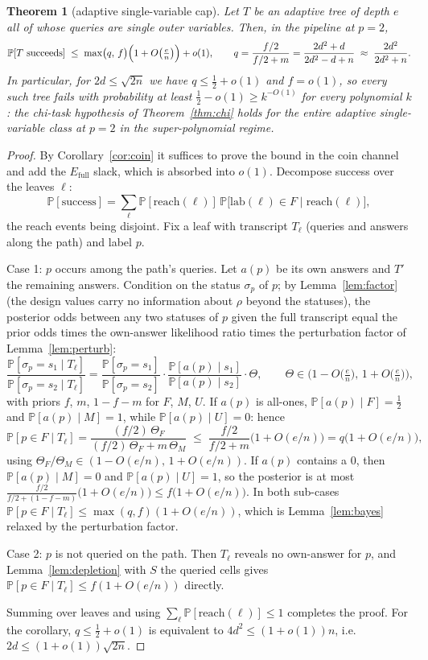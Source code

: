 \documentclass[11pt]{article}
\newtheorem{theorem}{Theorem}[section]
\theoremstyle{definition}
\theoremstyle{remark}
\newcommand{\Prob}{\mathbb{P}}
\newcommand{\lab}{\mathrm{lab}}
\begin{document}
\begin{theorem}[adaptive single-variable cap]\label{thm:B}
Let $T$ be an adaptive tree of depth $e$ all of whose queries are single
outer variables.  Then, in the pipeline at $p=2$,
\[
\Prob[T\text{ succeeds}]
\;\le\;\max\bigl(q,\,f\bigr)
\Bigl(1+O\bigl(\tfrac{e}{n}\bigr)\Bigr)+o(1),
\qquad
q=\frac{f/2}{f/2+m}=\frac{2d^2+d}{2d^2-d+n}
\;\approx\;\frac{2d^2}{2d^2+n}.
\]
In particular, for $2d\le\sqrt{2n}$ we have $q\le\frac12+o(1)$ and
$f=o(1)$, so every such tree fails with probability at least
$\frac12-o(1)\ge k^{-O(1)}$ for every polynomial $k$: the chi-task
hypothesis of Theorem~\ref{thm:chi} holds for the entire adaptive
single-variable class at $p=2$ in the super-polynomial regime.
\end{theorem}

\begin{proof}
By Corollary~\ref{cor:coin} it suffices to prove the bound in the coin
channel and add the $E_{\mathrm{full}}$ slack, which is absorbed into
$o(1)$.  Decompose success over the leaves $\ell$:
\[
\Prob[\text{success}]
=\sum_{\ell}\Prob[\mathrm{reach}(\ell)]\,
\Prob\bigl[\lab(\ell)\in F \mid \mathrm{reach}(\ell)\bigr],
\]
the reach events being disjoint.  Fix a leaf with transcript
$T_\ell$ (queries and answers along the path) and label $p$.

Case 1: $p$ occurs among the path's queries.  Let $a(p)$ be its own
answers and $T'$ the remaining answers.  Condition on the status
$\sigma_p$ of $p$; by Lemma~\ref{lem:factor} (the design values carry no
information about $\rho$ beyond the statuses), the posterior odds
between any two statuses of $p$ given the full transcript equal the
prior odds times the own-answer likelihood ratio times the perturbation
factor of Lemma~\ref{lem:perturb}:
\[
\frac{\Prob[\sigma_p=s_1\mid T_\ell]}{\Prob[\sigma_p=s_2\mid T_\ell]}
=\frac{\Prob[\sigma_p=s_1]}{\Prob[\sigma_p=s_2]}
\cdot\frac{\Prob[a(p)\mid s_1]}{\Prob[a(p)\mid s_2]}
\cdot\Theta ,
\qquad
\Theta\in\bigl(1-O\bigl(\tfrac{e}{n}\bigr),\,1+O\bigl(\tfrac{e}{n}\bigr)\bigr),
\]
with priors $f$, $m$, $1-f-m$ for $F$, $M$, $U$.  If $a(p)$ is
all-ones, $\Prob[a(p)\mid F]=\tfrac12$ and $\Prob[a(p)\mid M]=1$, while
$\Prob[a(p)\mid U]=0$: hence
\[
\Prob[p\in F\mid T_\ell]
=\frac{(f/2)\,\Theta_F}{(f/2)\,\Theta_F+m\,\Theta_M}
\;\le\;\frac{f/2}{f/2+m}\bigl(1+O(e/n)\bigr)
=q\bigl(1+O(e/n)\bigr),
\]
using $\Theta_F/\Theta_M\in(1-O(e/n),\,1+O(e/n))$.  If $a(p)$ contains
a $0$, then $\Prob[a(p)\mid M]=0$ and $\Prob[a(p)\mid U]=1$, so the
posterior is at most
$\frac{f/2}{f/2+(1-f-m)}\bigl(1+O(e/n)\bigr)\le f\bigl(1+O(e/n)\bigr)$.
In both sub-cases
$\Prob[p\in F\mid T_\ell]\le\max(q,f)(1+O(e/n))$, which is
Lemma~\ref{lem:bayes} relaxed by the perturbation factor.

Case 2: $p$ is not queried on the path.  Then $T_\ell$ reveals no
own-answer for $p$, and Lemma~\ref{lem:depletion} with $S$ the queried
cells gives $\Prob[p\in F\mid T_\ell]\le f(1+O(e/n))$ directly.

Summing over leaves and using
$\sum_\ell\Prob[\mathrm{reach}(\ell)]\le 1$ completes the proof.  For
the corollary, $q\le\frac12+o(1)$ is equivalent to $4d^2\le(1+o(1))n$,
i.e.\ $2d\le(1+o(1))\sqrt{2n}$.
\end{proof}
\end{document}
